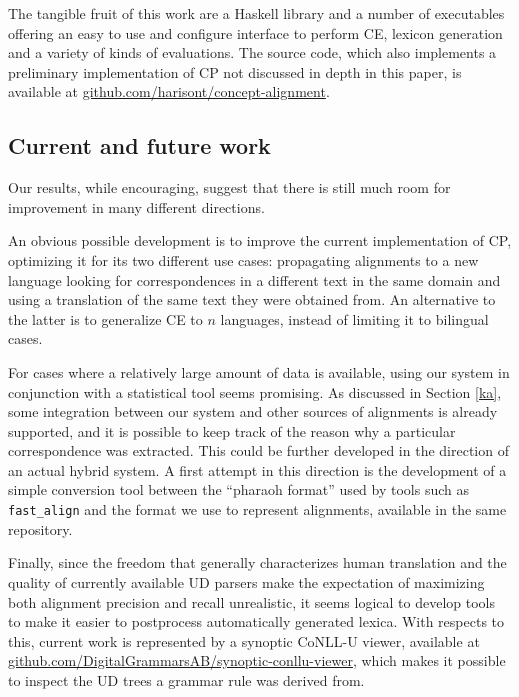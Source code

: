 \documentclass[11pt]{article}
\begin{document}
The tangible fruit of this work are a Haskell library and a number of executables offering an easy to use and configure interface to perform CE, lexicon generation and a variety of kinds of evaluations. The source code, which also implements a preliminary implementation of CP not discussed in depth in this paper, is available at \url{github.com/harisont/concept-alignment}.

\subsection{Current and future work}
Our results, while encouraging, suggest that there is still much room for improvement in many different directions.

An obvious possible development is to improve the current implementation of CP, optimizing it for its two different use cases: propagating alignments to a new language looking for correspondences in a different text in the same domain and using a translation of the same text they were obtained from. 
An alternative to the latter is to generalize CE to $n$ languages, instead of limiting it to bilingual cases.

For cases where a relatively large amount of data is available, using our system in conjunction with a statistical tool seems promising. 
As discussed in Section \ref{ka}, some integration between our system and other sources of alignments is already supported, and it is possible to keep track of the reason why a particular correspondence was extracted. 
This could be further developed in the direction of an actual hybrid system. 
A first attempt in this direction is the development of a simple conversion tool between the ``pharaoh format'' used by tools such as \texttt{fast\_align} and the format we use to represent alignments, available in the same repository.

Finally, since the freedom that generally characterizes human translation and the quality of currently available UD parsers make the expectation of maximizing both alignment precision and recall unrealistic, it seems logical to develop tools to make it easier to postprocess automatically generated lexica.
With respects to this, current work is represented by a synoptic CoNLL-U viewer, available at \url{github.com/DigitalGrammarsAB/synoptic-conllu-viewer}, which makes it possible to inspect the UD trees a grammar rule was derived from. 

%
%
\end{document}
